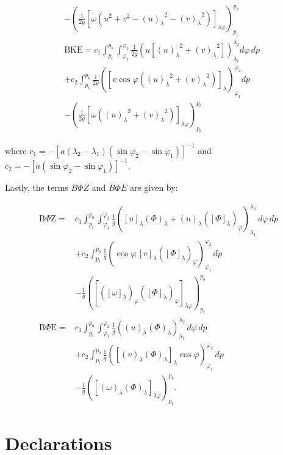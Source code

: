 \documentclass[pdflatex,sn-chicago]{sn-jnl}%
\theoremstyle{plain}
\theoremstyle{definition}
\theoremstyle{remark}
\theoremstyle{definition}
\begin{document}
\begin{align}
& -\left(\frac{1}{2g}\left[\omega\left(u^2+v^2-{(u)_\lambda}^2-{(v)_\lambda}^2\right)\right]_{\lambda\varphi}\right)_{p_t}^{p_b} \\
& \mathrm{BKE}=c_1 \int_{p_t}^{p_b} \int_{\varphi_1}^{\varphi_2} \frac{1}{2g}\left(u\left[{(u)_\lambda}^2+{(v)_\lambda}^2\right]\right)_{\lambda_1}^{\lambda_2} d\varphi\,dp \nonumber \\
& +c_2 \int_{p_t}^{p_b} \frac{1}{2g}\left(\left[v\cos\varphi\left({(u)_\lambda}^2+{(v)_\lambda}^2\right)\right]_\lambda\right)_{\varphi_1}^{\varphi_2} dp \nonumber \\
& -\left(\frac{1}{2g}\left[\omega\left({(u)_\lambda}^2+{(v)_\lambda}^2\right)\right]_{\lambda\varphi}\right)_{p_t}^{p_b}
\end{align}

where $c_1=-\left[a\left(\lambda_2-\lambda_1\right)
\left(\sin\varphi_2-\sin\varphi_1\right)\right]^{-1}$
and $c_2=-\left[a\left(\sin\varphi_2-\sin\varphi_1\right)\right]^{-1}$.


Lastly, the terms $B\Phi Z$ and $B\Phi E$ are given by:

\begin{align}
\mathrm{B}\Phi\mathrm{Z}
={}& c_1 \int_{p_t}^{p_b} \int_{\varphi_1}^{\varphi_2}
\frac{1}{g}
\left(
[u]_\lambda(\Phi)_\lambda
+(u)_\lambda\left([\Phi]_\lambda\right)_\varphi
\right)_{\lambda_1}^{\lambda_2}
\,d\varphi\,dp
\nonumber \\
&+c_2 \int_{p_t}^{p_b}
\frac{1}{g}
\left(
\cos\varphi\,[v]_\lambda
\left([\Phi]_\lambda\right)_\varphi
\right)_{\varphi_1}^{\varphi_2}
\,dp
\nonumber \\
&-\frac{1}{g}
\left(
\left[
\left([\omega]_\lambda\right)_\varphi
\left([\Phi]_\lambda\right)_\varphi
\right]_{\lambda\varphi}
\right)_{p_t}^{p_b}
\\
\mathrm{B}\Phi\mathrm{E}
={}& c_1 \int_{p_t}^{p_b} \int_{\varphi_1}^{\varphi_2}
\frac{1}{g}
\left(
(u)_\lambda(\Phi)_\lambda
\right)_{\lambda_1}^{\lambda_2}
\,d\varphi\,dp
\nonumber \\
&+c_2 \int_{p_t}^{p_b}
\frac{1}{g}
\left(
\left[(v)_\lambda(\Phi)_\lambda\right]_\lambda
\cos\varphi
\right)_{\varphi_1}^{\varphi_2}
\,dp
\nonumber \\
&-\frac{1}{g}
\left(
\left[(\omega)_\lambda(\Phi)_\lambda\right]_{\lambda\varphi}
\right)_{p_t}^{p_b}.
\end{align}

\section*{Declarations}
\end{document}

